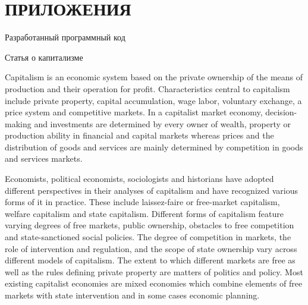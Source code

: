 \chapter*{ПРИЛОЖЕНИЯ}

\begin{flushright}
{}
\end{flushright}
\begin{center}
Разработанный программный код
\end{center}







\newpage

\begin{flushright}
{} 
\end{flushright}
\begin{center}
Статья о капитализме
\end{center}
Capitalism is an economic system based on the private ownership of the means of production and their operation for profit. Characteristics central to capitalism include private property, capital accumulation, wage labor, voluntary exchange, a price system and competitive markets. In a capitalist market economy, decision-making and investments are determined by every owner of wealth, property or production ability in financial and capital markets whereas prices and the distribution of goods and services are mainly determined by competition in goods and services markets.

Economists, political economists, sociologists and historians have adopted different perspectives in their analyses of capitalism and have recognized various forms of it in practice. These include laissez-faire or free-market capitalism, welfare capitalism and state capitalism. Different forms of capitalism feature varying degrees of free markets, public ownership, obstacles to free competition and state-sanctioned social policies. The degree of competition in markets, the role of intervention and regulation, and the scope of state ownership vary across different models of capitalism. The extent to which different markets are free as well as the rules defining private property are matters of politics and policy. Most existing capitalist economies are mixed economies which combine elements of free markets with state intervention and in some cases economic planning.

